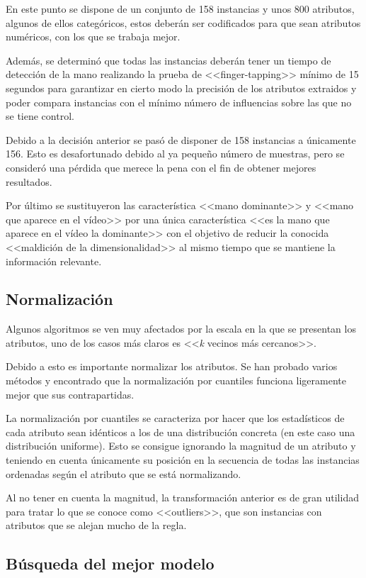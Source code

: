 En este punto se dispone de un conjunto de 158 instancias y unos 800 atributos,
algunos de ellos categóricos, estos deberán ser codificados para que sean
atributos numéricos, con los que se trabaja mejor.

Además, se determinó que todas las instancias deberán tener un tiempo de
detección de la mano realizando la prueba de <<finger-tapping>> mínimo de 15
segundos para garantizar en cierto modo la precisión de los atributos extraidos
y poder compara instancias con el mínimo número de influencias sobre las que no
se tiene control.

Debido a la decisión anterior se pasó de disponer de 158 instancias a únicamente
156. Esto es desafortunado debido al ya pequeño número de muestras, pero se
consideró una pérdida que merece la pena con el fin de obtener mejores
resultados.

Por último se sustituyeron las característica <<mano dominante>> y <<mano que
aparece en el vídeo>> por una única característica <<es la mano que aparece en
el vídeo la dominante>> con el objetivo de reducir la conocida <<maldición de la
dimensionalidad>> al mismo tiempo que se mantiene la información relevante.

\subsection{Normalización}

Algunos algoritmos se ven muy afectados por la escala en la que se presentan los
atributos, uno de los casos más claros es <<\textit{k} vecinos más cercanos>>.

Debido a esto es importante normalizar los atributos. Se han probado varios
métodos y encontrado que la normalización por cuantiles funciona ligeramente
mejor que sus contrapartidas.

La normalización por cuantiles se caracteriza por hacer que los estadísticos de
cada atributo sean idénticos a los de una distribución concreta (en este caso
una distribución uniforme). Esto se consigue ignorando la magnitud de un
atributo y teniendo en cuenta únicamente su posición en la secuencia de todas
las instancias ordenadas según el atributo que se está normalizando.

Al no tener en cuenta la magnitud, la transformación anterior es de gran
utilidad para tratar lo que se conoce como <<outliers>>, que son instancias con
atributos que se alejan mucho de la regla.

\subsection{Búsqueda del mejor modelo}

